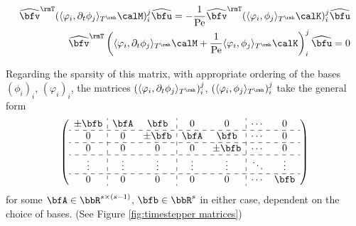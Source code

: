 \begin{example}
        \begin{align}
            \widehat{\bfv}^{\rmT}(\langle\varphi_{i}, \partial_{t}\phi_{j}\rangle_{T^{\rmh}}\calM)^{j}_{i}\widehat{\bfu}  =  - \frac{1}{\rmPe}\widehat{\bfv}^{\rmT}(\langle\varphi_{i}, \phi_{j}\rangle_{T^{\rmh}}\calK)^{j}_{i}\widehat{\bfu}  \\
            \widehat{\bfv}^{\rmT}\left(\langle\varphi_{i}, \partial_{t}\phi_{j}\rangle_{T^{\rmh}}\calM + \frac{1}{\rmPe}\langle\varphi_{i}, \phi_{j}\rangle_{T^{\rmh}}\calK\right)^{j}_{i}\widehat{\bfu}  =  0
        \end{align}
        
        Regarding the sparsity of this matrix, with appropriate ordering of the bases $(\phi_{i})_{i}$, $(\varphi_{i})_{i}$, the matrices $(\langle\varphi_{i}, \partial_{t}\phi_{j}\rangle_{T^{\rmh}})^{j}_{i}$, $(\langle\varphi_{i}, \phi_{j}\rangle_{T^{\rmh}})^{j}_{i}$ take the general form
        \begin{equation}\label{eqn:timestepper matrices}
            \left(\begin{array}{ c : c c : c c : c c }
                \pm\bfb  &  \bfA    &  \bfb     &  0       &  0        &  \cdots   &  0        \\
                \hdashline
                0        &  0       &  \pm\bfb  &  \bfA    &  \bfb     &  \cdots   &  0        \\
                \hdashline
                0        &  0       &  0        &  0       &  \pm\bfb  &  \cdots   &  0        \\
                \hdashline
                \vdots   &  \vdots  &  \vdots   &  \vdots  &  \vdots   &  \ddots   &  \vdots   \\
                \hdashline
                0        &  0       &  0        &  0       &  0        &  \cdots   &  \bfb     \\
            \end{array}\right)
        \end{equation}
        for some $\bfA  \in  \bbR^{s\times (s - 1)}$, $\bfb  \in  \bbR^{s}$ in either case, dependent on the choice of bases. (See Figure \ref{fig:timestepper matrices})
        

\end{example}
